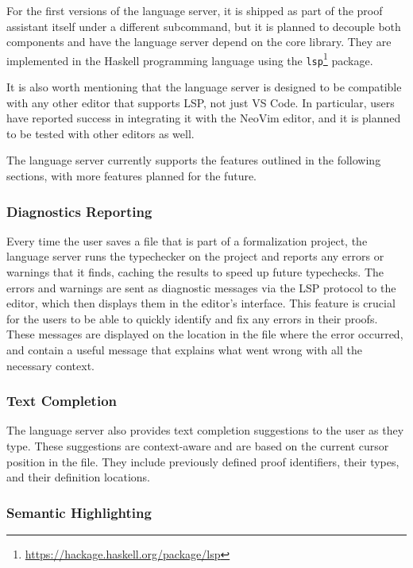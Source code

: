 For the first versions of the language server, it is shipped as part of the \Rzk{} proof assistant itself under a different subcommand, but it is planned to decouple both components and have the language server depend on the core library. They are implemented in the Haskell programming language using the \texttt{lsp}\footnote{\url{https://hackage.haskell.org/package/lsp}} package.

It is also worth mentioning that the language server is designed to be compatible
with any other editor that supports LSP, not just VS Code.
In particular, users have reported success in integrating it with the NeoVim editor,
and it is planned to be tested with other editors as well.

The language server currently supports the features outlined in the following sections, with more features planned for the future.

\subsubsection{Diagnostics Reporting}

Every time the user saves a file that is part of a formalization project, the language server runs the typechecker
on the project and reports any errors or warnings that it finds, caching the results to speed up future typechecks.
The errors and warnings are sent as diagnostic messages via the LSP protocol to the editor,
which then displays them in the editor's interface.
This feature is crucial for the users to be able to quickly identify and fix any errors in their proofs.
These messages are displayed on the location in the file where the error occurred,
and contain a useful message that explains what went wrong with all the necessary context.

\subsubsection{Text Completion}

The language server also provides text completion suggestions to the user as they type.
These suggestions are context-aware and are based on the current cursor position in the file.
They include previously defined proof identifiers, their types, and their definition locations.

\subsubsection{Semantic Highlighting}

